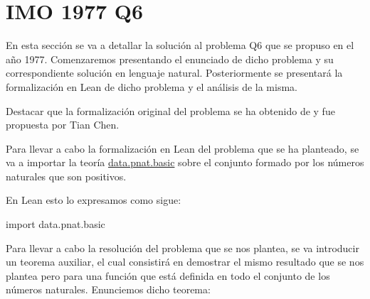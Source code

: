 
\section{IMO 1977 Q6}

En esta sección se va a detallar la solución al problema Q6 que se
propuso en el año 1977. Comenzaremos presentando el enunciado de dicho
problema y su correspondiente solución en lenguaje
natural. Posteriormente se presentará la formalización en Lean de dicho
problema y el análisis de la misma.

Destacar que la formalización original del problema se ha obtenido de
\cite{TC} y fue propuesta por Tian Chen.

\noindent
{}

Para llevar a cabo la formalización en Lean del problema que
se ha planteado, se va a importar la teoría
\href{https://github.com/leanprover-community/mathlib/blob/
  master/src/data/pnat/basic.lean}{data.pnat.basic} sobre el conjunto
formado por los números naturales que son positivos.

En Lean esto lo expresamos como sigue:
\begin{leancode}
import data.pnat.basic
\end{leancode}

Para llevar a cabo la resolución del problema que se nos plantea,
se va introducir un teorema auxiliar, el cual consistirá en
demostrar el mismo resultado que se nos plantea pero para una
función que está definida en todo el conjunto de los números
naturales. Enunciemos dicho teorema:

